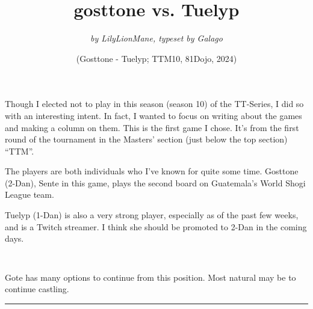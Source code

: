 \documentclass{article}
\begin{document}
\large
\title{\textbf{gosttone vs. Tuelyp}}
\author{\textit{by LilyLionMane, typeset by Galago}}
\date{(Gosttone - Tuelyp; TTM10, 81Dojo, 2024)}
\maketitle



Though I elected not to play in this season (season 10) of the TT-Series, I did so with an interesting intent. In fact, I wanted to focus on writing about the games and making a column on them. This is the first game I chose. It's from the first round of the tournament in the Masters' section (just below the top section) ``TTM''.

The players are both individuals who I've known for quite some time. Gosttone (2-Dan), Sente in this game, plays the second board on Guatemala's World Shogi League team.

Tuelyp (1-Dan) is also a very strong player, especially as of the past few weeks, and is a Twitch streamer. I think she should be promoted to 2-Dan in the coming days.
\pagebreak

\sidebyside
{
\newline
{}
}
{
\normalsize
{}

\texttt{ 
}


\texttt{}


\noindent Gote has many options to continue from this position. Most natural may be to continue castling.
}

\pagebreak


\begin{chessmoves}
\end{chessmoves}

\vspace{1in}
\hrule
\vspace{1in}

\begin{shogimoves}
\end{shogimoves}
\end{document}

